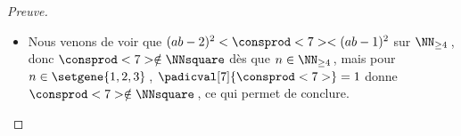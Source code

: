 \begin{proof}[Preuve]
	\begin{itemize}
		\item Nous venons de voir que $( a b - 2)^2 < \consprod<7> < ( a b - 1)^2$ sur $\NN_{\geq 4}$\,, donc $\consprod<7> \notin \NNsquare$ dès que $n \in \NN_{\geq 4}$\,, mais pour $n \in \setgene{1, 2, 3}$\,, $\padicval[7]{\consprod<7>} =1$ donne $\consprod<7> \notin \NNsquare$\,, ce qui permet de conclure.
	\end{itemize}
\end{proof}


%    
%    

